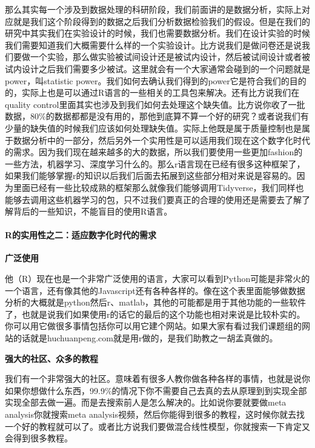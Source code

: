 \documentclass[
  oneside]{book}
\begin{document}
那么其实每一个涉及到数据处理的科研阶段，我们前面讲的是数据分析，实际上对应就是我们这个阶段得到的数据之后我们分析数据检验我们的假设。但是在我们的研究中其实我们在实验设计的时候，我们也需要数据分析。我们在设计实验的时候我们需要知道我们大概需要什么样的一个实验设计。比方说我们是做问卷还是说我们要做一个实验，那么做实验被试间设计还是被试内设计，然后被试间设计或者被试内设计之后我们需要多少被试。这里就会有一个大家通常会碰到的一个问题就是power，叫statistic power。我们如何去确认我们得到的power它是符合我们的目的的，实际上也是可以通过R语言的一些相关的工具包来解决。还有比方说我们在quality control里面其实也涉及到我们如何去处理这个缺失值。比方说你收了一批数据，80\%的数据都都是没有用的，那他到底算不算一个好的研究？或者说我们有少量的缺失值的时候我们应该如何处理缺失值。实际上他既是属于质量控制也是属于数据分析中的一部分，然后另外一个实用性是可以适用我们现在这个数字化时代的需求。因为我们现在越来越多的大的数据，所以我们要使用一些更加fashion的一些方法，机器学习、深度学习什么的。那么r语言现在已经有很多这种框架了，如果我们能够掌握r的知识以后我们后面去拓展到这些部分相对来说是容易的。因为里面已经有一些比较成熟的框架那么就像我们能够调用Tidyverse，我们同样也能够去调用这些机器学习的包，只不过我们要真正的合理的使用还是需要去了解了解背后的一些知识，不能盲目的使用R语言。

\hypertarget{rux7684ux5b9eux7528ux6027ux4e4bux4e8cux9002ux5e94ux6570ux5b57ux5316ux65f6ux4ee3ux7684ux9700ux6c42}{%
\paragraph{R的实用性之二：适应数字化时代的需求}\label{rux7684ux5b9eux7528ux6027ux4e4bux4e8cux9002ux5e94ux6570ux5b57ux5316ux65f6ux4ee3ux7684ux9700ux6c42}}

\textbf{广泛使用}

他（R）现在也是一个非常广泛使用的语言，大家可以看到Python可能是非常火的一个语言，还有像其他的Javascript还有各种各样的。像在这个表里面能够做数据分析的大概就是python然后r、matlab，其他的可能都是用于其他功能的一些软件了，也就是说我们如果使用r的话它的最后的这个功能也相对来说是比较朴实的。你可以用它做很多事情包括你可以用它建个网站。如果大家有看过我们课题组的网站的话就是huchuanpeng.com就是用r做的，是我们助教之一胡孟真做的。

\textbf{强大的社区、众多的教程}

我们有一个非常强大的社区。意味着有很多人教你做各种各样的事情，也就是说你如果你想做什么东西，99.9\%的情况下你不需要自己去真的去从原理到到实现全部实现全部去做一遍。而是去搜索前人是怎么解决的。比如说你要就要做meta analysis你就搜索meta analysis视频，然后你能得到很多的教程，这时候你就去找一个好的教程就可以了。或者比方说我们要做混合线性模型，你就搜索一下肯定又会得到很多教程。
\end{document}
